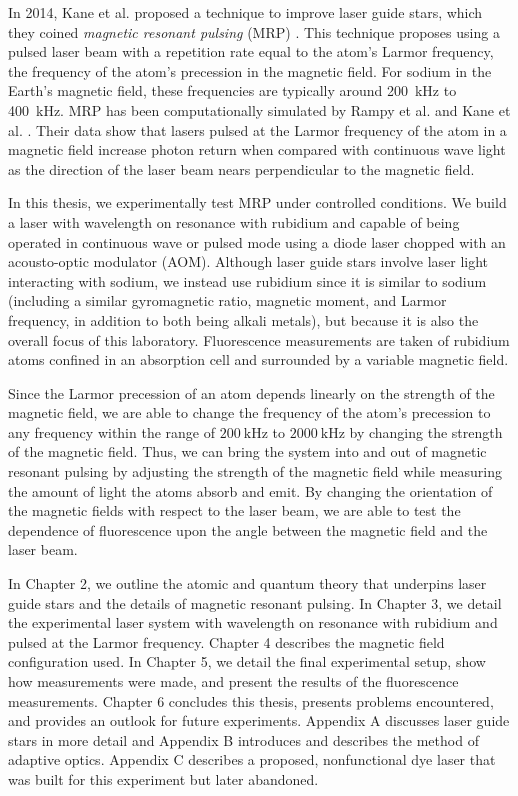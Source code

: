 In 2014, Kane et al. proposed a technique to improve laser guide stars, which they coined \textit{magnetic resonant pulsing} (MRP) \cite{Kane2014}. This technique proposes using a pulsed laser beam with a repetition rate equal to the atom's Larmor frequency, the frequency of the atom's precession in the magnetic field. For sodium in the Earth's magnetic field, these frequencies are typically around \SI{200}{\kilo Hz} to \SI{400}{\kilo Hz}. MRP has been computationally simulated by Rampy et al. and Kane et al. \cite{Rampy2010,Kane2014}. Their data show that lasers pulsed at the Larmor frequency of the atom in a magnetic field increase photon return when compared with continuous wave light as the direction of the laser beam nears perpendicular to the magnetic field.

In this thesis, we experimentally test MRP under controlled conditions. We build a laser with wavelength on resonance with rubidium and capable of being operated in continuous wave or pulsed mode using a diode laser chopped with an acousto-optic modulator (AOM). Although laser guide stars involve laser light interacting with sodium, we instead use rubidium since it is similar to sodium (including a similar gyromagnetic ratio, magnetic moment, and Larmor frequency, in addition to both being alkali metals), but because it is also the overall focus of this laboratory. Fluorescence measurements are taken of rubidium atoms confined in an absorption cell and surrounded by a variable magnetic field. 


Since the Larmor precession of an atom depends linearly on the strength of the magnetic field, we are able to change the frequency of the atom's precession to any frequency within the range of $\SI{200}{\kilo \hertz}$ to $\SI{2000}{\kilo \hertz}$ by changing the strength of the magnetic field. Thus, we can bring the system into and out of magnetic resonant pulsing by adjusting the strength of the magnetic field while measuring the amount of light the atoms absorb and emit. By changing the orientation of the magnetic fields with respect to the laser beam, we are able to test the dependence of fluorescence upon the angle between the magnetic field and the laser beam. 

In Chapter 2, we outline the atomic and quantum theory that underpins laser guide stars and the details of magnetic resonant pulsing. In Chapter 3, we detail the experimental laser system with wavelength on resonance with rubidium and pulsed at the Larmor frequency. Chapter 4 describes the magnetic field configuration used. In Chapter 5, we detail the final experimental setup, show how measurements were made, and present the results of the fluorescence measurements. Chapter 6 concludes this thesis, presents problems encountered, and provides an outlook for future experiments. Appendix A discusses laser guide stars in more detail and Appendix B introduces and describes the method of adaptive optics. Appendix C describes a proposed, nonfunctional dye laser that was built for this experiment but later abandoned. 


